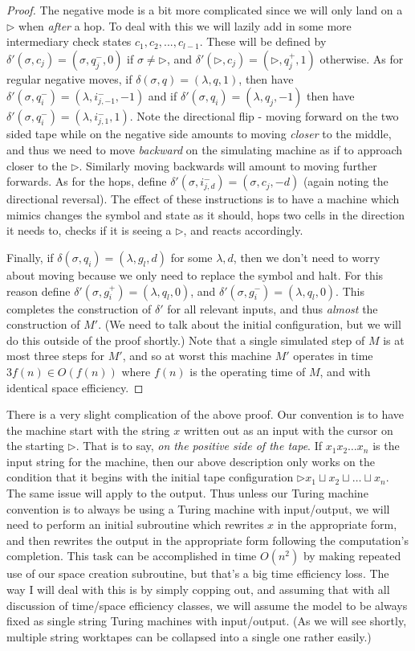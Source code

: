 \documentclass{article}
\theoremstyle{definition}
\theoremstyle{plain}
\theoremstyle{theorem}
\begin{document}
\begin{proof}
	The negative mode is a bit more complicated since we will only land on a $\triangleright$ when \textit{after} a hop. To deal with this we will lazily add in some more intermediary check states $c_1,c_2,...,c_{l-1}$. These will be defined by $\delta'(\sigma,c_j) = (\sigma,q_j^-,0)$ if $\sigma \neq \triangleright$, and $\delta'(\triangleright,c_j) = (\triangleright,q_j^+,1)$ otherwise. As for regular negative moves, if $\delta(\sigma,q) = (\lambda,q,1)$, then have $\delta'(\sigma,q_i^-) = (\lambda,i_{j,-1}^-,-1)$ and if $\delta'(\sigma,q_i) = (\lambda,q_j,-1)$ then have $\delta'(\sigma,q_i^-) = (\lambda,i_{j,1}^-,1)$. Note the directional flip - moving forward on the two sided tape while on the negative side amounts to moving \textit{closer} to the middle, and thus we need to move \textit{backward} on the simulating machine as if to approach closer to the $\triangleright$. Similarly moving backwards will amount to moving further forwards. As for the hops, define $\delta'(\sigma,i_{j,d}^-) = (\sigma,c_j,-d)$ (again noting the directional reversal). The effect of these instructions is to have a machine which mimics changes the symbol and state as it should, hops two cells in the direction it needs to, checks if it is seeing a $\triangleright$, and reacts accordingly. \par 
	Finally, if $\delta(\sigma,q_i) = (\lambda,g_l,d)$ for some $\lambda,d$, then we don't need to worry about moving because we only need to replace the symbol and halt. For this reason define $\delta'(\sigma,g_i^+) = (\lambda,q_l,0)$, and $\delta'(\sigma,g_i^-) = (\lambda,q_l,0)$. This completes the construction of $\delta'$ for all relevant inputs, and thus \textit{almost} the construction of $M'$. 
(We need to talk about the initial configuration, but we will do this outside of the proof shortly.) Note that a single simulated step of $M$ is at most three steps for $M'$, and so at worst this machine $M'$ operates in time $3f(n) \in O(f(n))$ where $f(n)$ is the operating time of $M$, and with identical space efficiency.	
\end{proof}
There is a very slight complication of the above proof. Our convention is to have the machine start with the string $x$ written out as an input with the cursor on the starting $\triangleright$. That is to say, \textit{on the positive side of the tape}. If $x_1 x_2 \ldots x_n$ is the input string for the machine, then our above description only works on the condition that it begins with the initial tape configuration $\triangleright x_1 \sqcup x_2 \sqcup \ldots \sqcup x_n$. The same issue will apply to the output. Thus unless our Turing machine convention is to always be using a Turing machine with input/output, we will need to perform an initial subroutine which rewrites $x$ in the appropriate form, and then rewrites the output in the appropriate form following the computation's completion. This task can be accomplished in time $O(n^2)$ by making repeated use of our space creation subroutine, but that's a big time efficiency loss. The way I will deal with this is by simply copping out, and assuming that with all discussion of time/space efficiency classes, we will assume the model to be always fixed as single string Turing machines with input/output. (As we will see shortly, multiple string worktapes can be collapsed into a single one rather easily.)
\end{document}
